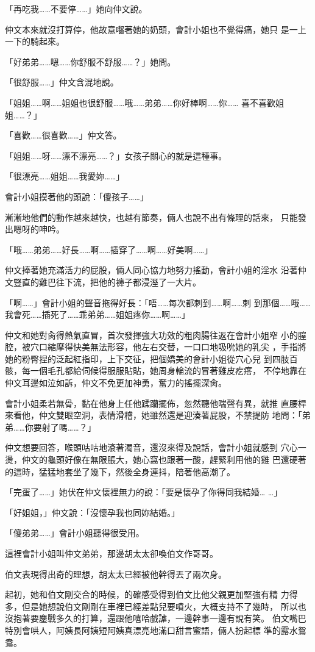 「再吃我……不要停……」她向仲文說。

仲文本來就沒打算停，他故意囓著她的奶頭，會計小姐也不覺得痛，她只
是一上一下的騎起來。

「好弟弟……嗯……你舒服不舒服……？」她問。

「很舒服……」仲文含混地說。

「姐姐……啊……姐姐也很舒服……哦……弟弟……你好棒啊……你……
喜不喜歡姐姐……？」

「喜歡……很喜歡……」仲文答。

「姐姐……呀……漂不漂亮……？」女孩子關心的就是這種事。

「很漂亮……姐姐……我愛妳……」

會計小姐摸著他的頭說：「傻孩子……」

漸漸地他們的動作越來越快，也越有節奏，倆人也說不出有條理的話來，
只能發出嗯呀的呻吟。

「哦……弟弟……好長……啊……插穿了……啊……好美啊……」

仲文捧著她充滿活力的屁股，倆人同心協力地努力搖動，會計小姐的淫水
沿著仲文豎直的雞巴往下流，把他的褲子都浸溼了一大片。

「啊……」會計小姐的聲音拖得好長：「唔……每次都刺到……啊……刺
到那個……哦……我會死……插死了……乖弟弟……姐姐疼你……啊……」

仲文和她對肏得熱氣直冒，首次發揮強大功效的粗肉腸往返在會計小姐窄
小的膣腔，被穴口縮摩得快美無法形容，他左右交替，一口口地吸吮她的乳尖
，手指將她的粉臀捏的泛起紅指印，上下交征，把個嬌美的會計小姐從穴心兒
到四肢百骸，每一個毛孔都給伺候得服服貼貼，她周身輪流的冒著雞皮疙瘩，
不停地靠在仲文耳邊如泣如訴，仲文不免更加神勇，奮力的搖擺深肏。

會計小姐柔若無骨，黏在他身上任他蹂躪擺佈，忽然聽他喘聲有異，就推
直腰桿來看他，仲文雙眼空洞，表情滑稽，她雖然還是迎湊著屁股，不禁提防
地問：「弟弟……你要射了嗎……？」

仲文想要回答，喉頭咕咕地滾著濁音，還沒來得及說話，會計小姐就感到
穴心一燙，仲文的龜頭好像在無限脹大，她心窩也跟著一酸，趕緊利用他的雞
巴還硬著的這時，猛猛地套坐了幾下，然後全身連抖，陪著他高潮了。

「完蛋了……」她伏在仲文懷裡無力的說：「要是懷孕了你得同我結婚…
…」

「好姐姐，」仲文說：「沒懷孕我也同妳結婚。」

「傻弟弟……」會計小姐聽得很受用。

這裡會計小姐叫仲文弟弟，那邊胡太太卻喚伯文作哥哥。

伯文表現得出奇的理想，胡太太已經被他幹得丟了兩次身。

起初，她和伯文剛交合的時候，的確感受得到伯文比他父親更加堅強有精
力得多，但是她想說伯文剛剛在車裡已經差點兒要噴火，大概支持不了幾時，
所以也沒抱著要鏖戰多久的打算，還跟他嘻哈戲謔，一邊幹事一邊有說有笑。
伯文嘴巴特別會哄人，阿姨長阿姨短阿姨真漂亮地滿口甜言蜜語，倆人扮起標
準的露水鴛鴦。

